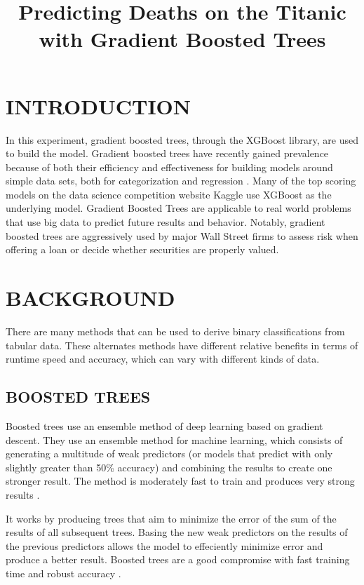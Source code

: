 \documentclass[12pt]{article}
\title{Predicting Deaths on the Titanic with Gradient Boosted Trees}
\author{\sc{Ethan Reese}}
\begin{document}
      \maketitle

    \section{INTRODUCTION}
     In this experiment, gradient boosted trees, through the XGBoost library, are used to build the model. Gradient boosted trees have recently gained prevalence because of both their efficiency and effectiveness for building models around simple data sets, both for categorization and regression \cite{one}. Many of the top scoring models on the data science competition website Kaggle use XGBoost as the underlying model. Gradient Boosted Trees are applicable to real world problems that use big data to predict future results and behavior. Notably, gradient boosted trees are aggressively used by major Wall Street firms to assess risk when offering a loan or decide whether securities are properly valued.

     \section{BACKGROUND}
     There are many methods that can be used to derive binary classifications from tabular data. These alternates methods have different relative benefits in terms of runtime speed and accuracy, which can vary with different kinds of data.

     \subsection{BOOSTED TREES}
      Boosted trees use an ensemble method of deep learning based on gradient descent. They use an ensemble method for machine learning, which consists of generating a multitude of weak predictors (or models that predict with only slightly greater than 50\% accuracy) and combining the results to create one stronger result. The method is moderately fast to train and produces very strong results \cite{friedman2001elements}.

      It works by producing trees that aim to minimize the error of the sum of the results of all subsequent trees. Basing the new weak predictors on the results of the previous predictors allows the model to effeciently minimize error and produce a better result. Boosted trees are a good compromise with fast training time and robust accuracy \cite{friedman2001elements}.
\end{document}
